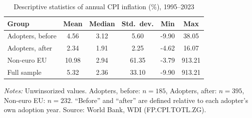 \begin{table}[htbp]\centering\small
\caption{Descriptive statistics of annual CPI inflation (\%), 1995--2023}\label{tab:desc}
\begin{tabular}{lccccc}
\toprule
Group & Mean & Median & Std.\ dev. & Min & Max \\
\midrule
Adopters, before & 4.56 & 3.12 & 5.60 & -9.90 & 38.05 \\
Adopters, after & 2.34 & 1.91 & 2.25 & -4.62 & 16.07 \\
Non-euro EU & 10.98 & 2.94 & 61.35 & -3.79 & 913.21 \\
\midrule
Full sample & 5.32 & 2.36 & 33.10 & -9.90 & 913.21 \\
\bottomrule
\end{tabular}
\begin{minipage}{0.9\linewidth}\vspace{4pt}\footnotesize\textit{Notes:} Unwinsorized values. Adopters, before: $n=185$, Adopters, after: $n=395$, Non-euro EU: $n=232$. ``Before'' and ``after'' are defined relative to each adopter's own adoption year. Source: World Bank, WDI (FP.CPI.TOTL.ZG).\end{minipage}
\end{table}